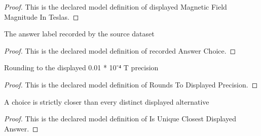 \begin{proof}
  This is the declared model definition of displayed Magnetic Field Magnitude In Teslas.
\end{proof}
\begin{definition}
  \label{def:physics:phyx-mini-0959:phyxminiproblems-problemphyxmini0959-recordedanswerchoice}
  The answer label recorded by the source dataset
\end{definition}
\begin{proof}
  This is the declared model definition of recorded Answer Choice.
\end{proof}
\begin{definition}
  \label{def:physics:phyx-mini-0959:phyxminiproblems-problemphyxmini0959-roundstodisplayedprecision}
  Rounding to the displayed 0.01 * 10⁻⁴ T precision
\end{definition}
\begin{proof}
  This is the declared model definition of Rounds To Displayed Precision.
\end{proof}
\begin{definition}
  \label{def:physics:phyx-mini-0959:phyxminiproblems-problemphyxmini0959-isuniqueclosestdisplayedanswer}
  A choice is strictly closer than every distinct displayed alternative
\end{definition}
\begin{proof}
  This is the declared model definition of Is Unique Closest Displayed Answer.
\end{proof}
